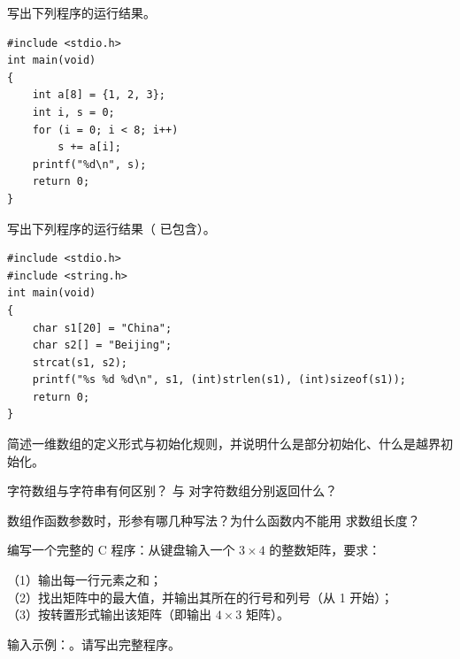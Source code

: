 \documentclass[a4paper,11pt]{article}
\begin{document}
\q 写出下列程序的运行结果。
\begin{lstlisting}[language={[custom]C}]
#include <stdio.h>
int main(void)
{
    int a[8] = {1, 2, 3};
    int i, s = 0;
    for (i = 0; i < 8; i++)
        s += a[i];
    printf("%d\n", s);
    return 0;
}
\end{lstlisting}
\anslines{2.4cm}

\q 写出下列程序的运行结果（ 已包含）。
\begin{lstlisting}[language={[custom]C}]
#include <stdio.h>
#include <string.h>
int main(void)
{
    char s1[20] = "China";
    char s2[] = "Beijing";
    strcat(s1, s2);
    printf("%s %d %d\n", s1, (int)strlen(s1), (int)sizeof(s1));
    return 0;
}
\end{lstlisting}
\anslines{2.6cm}

\q 简述一维数组的定义形式与初始化规则，并说明什么是部分初始化、什么是越界初始化。\anslines{3.2cm}

\q 字符数组与字符串有何区别？ 与  对字符数组分别返回什么？\anslines{3.2cm}

\q 数组作函数参数时，形参有哪几种写法？为什么函数内不能用  求数组长度？\anslines{3.0cm}

\newpage
{}
\q 编写一个完整的 C 程序：从键盘输入一个 $3\times4$ 的整数矩阵，要求：
\par\vspace{0.15em}
\noindent（1）输出每一行元素之和；\\
\noindent（2）找出矩阵中的最大值，并输出其所在的行号和列号（从 1 开始）；\\
\noindent（3）按转置形式输出该矩阵（即输出 $4\times3$ 矩阵）。

\noindent 输入示例：。请写出完整程序。\anslines{4.0cm}
\end{document}
